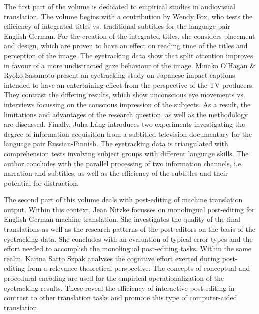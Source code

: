 \begin{styleTextbody}
The first part of the volume is dedicated to empirical studies in audiovisual translation. The volume begins with a contribution by Wendy Fox, who tests the efficiency of integrated titles vs. traditional subtitles for the language pair English-German. For the creation of the integrated titles, she considers placement and design, which are proven to have an effect on reading time of the titles and perception of the image. The eyetracking data show that split attention improves in favour of a more undistracted gaze behaviour of the image. Minako O’Hagan \& Ryoko Sasamoto present an eyetracking study on Japanese impact captions intended to have an entertaining effect from the perspective of the TV producers. They contrast the differing results, which show unconscious eye movements vs. interviews focussing on the conscious impression of the subjects. As a result, the limitations and advantages of the research question, as well as the methodology are discussed. Finally, Juha Lång introduces two experiments investigating the degree of information acquisition from a subtitled television documentary for the language pair Russian-Finnish. The eyetracking data is triangulated with comprehension tests involving subject groups with different language skills. The author concludes with the parallel processing of two information channels, i.e. narration and subtitles, as well as the efficiency of the subtitles and their potential for distraction.
\end{styleTextbody}

\begin{styleTextbody}
The second part of this volume deals with post-editing of machine translation output. Within this context, Jean Nitzke focusses on monolingual post-editing for English-German machine translation. She investigates the quality of the final translations as well as the research patterns of the post-editors on the basis of the eyetracking data. She concludes with an evaluation of typical error types and the effort needed to accomplish the monolingual post-editing tasks. Within the same realm, Karina Sarto Szpak analyses the cognitive effort exerted during post-editing from a relevance-theoretical perspective. The concepts of conceptual and procedural encoding are used for the empirical operationalization of the eyetracking results. These reveal the efficiency of interactive post-editing in contrast to other translation tasks and promote this type of computer-aided translation.
\end{styleTextbody}

